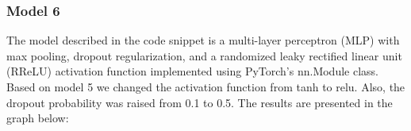 \subsubsection{Model 6}


The model described in the code snippet is a multi-layer perceptron (MLP) with max pooling, dropout regularization, and a randomized leaky rectified linear unit (RReLU) activation function implemented using PyTorch's nn.Module class. Based on model 5 we changed the activation function from tanh to relu. Also, the dropout probability was raised from 0.1 to 0.5. The results are presented in the graph below:





